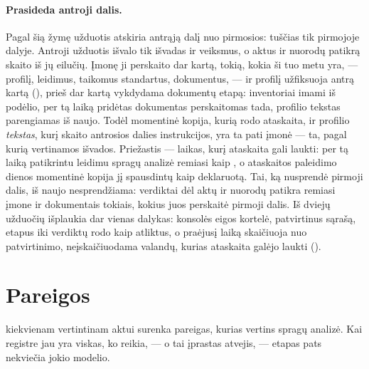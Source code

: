 \paragraph{Prasideda antroji dalis.} Pagal šią žymę užduotis atskiria antrąją dalį nuo
pirmosios:  tuščias tik pirmojoje dalyje. Antroji užduotis išvalo tik
išvadas ir veiksmus, o aktus ir nuorodų patikrą skaito iš jų eilučių. Įmonę ji perskaito dar
kartą, tokią, kokia ši tuo metu yra, --- profilį, leidimus, taikomus standartus, dokumentus, ---
ir profilį užfiksuoja antrą kartą (), prieš dar kartą vykdydama dokumentų
etapą: inventoriai imami iš podėlio, per tą laiką pridėtas dokumentas perskaitomas tada,
profilio tekstas parengiamas iš naujo. Todėl momentinė kopija, kurią rodo ataskaita, ir profilio
\emph{tekstas}, kurį skaito antrosios dalies instrukcijos, yra ta pati įmonė --- ta, pagal kurią
vertinamos išvados. Priežastis --- laikas, kurį ataskaita gali laukti: per tą laiką patikrintu
leidimu spragų analizė remiasi kaip , o ataskaitos paleidimo dienos momentinė
kopija jį spausdintų kaip deklaruotą. Tai, ką nusprendė pirmoji dalis, iš naujo nesprendžiama:
verdiktai dėl aktų ir nuorodų patikra remiasi įmone ir dokumentais tokiais, kokius juos
perskaitė pirmoji dalis. Iš dviejų užduočių išplaukia dar vienas dalykas: konsolės eigos
kortelė, patvirtinus sąrašą, etapus
iki verdiktų rodo kaip atliktus, o praėjusį laiką skaičiuoja nuo patvirtinimo, neįskaičiuodama
valandų, kurias ataskaita galėjo laukti ().


\section{Pareigos}\label{sec:report:obligations}

 kiekvienam vertintinam aktui surenka pareigas, kurias vertins spragų
analizė. Kai registre jau yra viskas, ko reikia, --- o tai įprastas atvejis, --- etapas pats
nekviečia jokio modelio.

